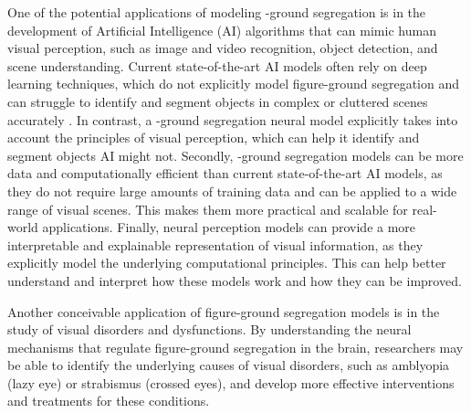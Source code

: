 One of the potential applications of modeling \stimfig-ground segregation is in the development of Artificial Intelligence (AI) algorithms that can mimic human visual perception, such as image and video recognition, object detection, and scene understanding. Current state-of-the-art AI models often rely on deep learning techniques, which do not explicitly model figure-ground segregation and can struggle to identify and segment objects in complex or cluttered scenes accurately \cite{Chu2020}. In contrast, a \stimfig-ground segregation neural model explicitly takes into account the principles of visual perception, which can help it identify and segment objects AI might not. 
Secondly, \stimfig-ground segregation models can be more data and computationally efficient than current state-of-the-art AI models, as they do not require large amounts of training data and can be applied to a wide range of visual scenes. This makes them more practical and scalable for real-world applications. 
Finally, neural perception models can provide a more interpretable and explainable representation of visual information, as they explicitly model the underlying computational principles. This can help better understand and interpret how these models work and how they can be improved.

Another conceivable application of figure-ground segregation models is in the study of visual disorders and dysfunctions. By understanding the neural mechanisms that regulate figure-ground segregation in the brain, researchers may be able to identify the underlying causes of visual disorders, such as amblyopia (lazy eye) or strabismus (crossed eyes), and develop more effective interventions and treatments for these conditions.

